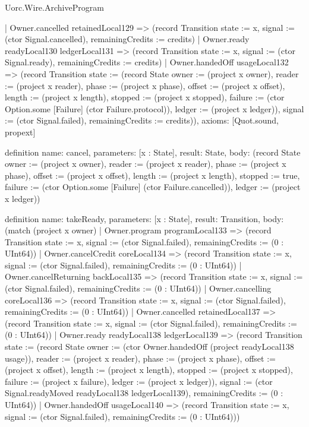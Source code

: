 \begin{lexlean}{Uorc.Wire.ArchiveProgram}
\begin{semanticmodule}
{    | Owner.cancelled retainedLocal129 => (record Transition {state := x, signal := (ctor Signal.cancelled), remainingCredits := credits})
    | Owner.ready readyLocal130 ledgerLocal131 => (record Transition {state := x, signal := (ctor Signal.ready), remainingCredits := credits})
    | Owner.handedOff usageLocal132 => (record Transition {state := (record State {owner := (project x owner), reader := (project x reader), phase := (project x phase), offset := (project x offset), length := (project x length), stopped := (project x stopped), failure := (ctor Option.some [Failure] (ctor Failure.protocol)), ledger := (project x ledger)}), signal := (ctor Signal.failed), remainingCredits := credits})),
  axioms: [Quot.sound, propext]
}

definition{
  name: cancel,
  parameters: [x : State],
  result: State,
  body: (record State {owner := (project x owner), reader := (project x reader), phase := (project x phase), offset := (project x offset), length := (project x length), stopped := true, failure := (ctor Option.some [Failure] (ctor Failure.cancelled)), ledger := (project x ledger)})
}

definition{
  name: takeReady,
  parameters: [x : State],
  result: Transition,
  body: (match (project x owner)
    | Owner.program programLocal133 => (record Transition {state := x, signal := (ctor Signal.failed), remainingCredits := (0 : UInt64)})
    | Owner.cancelCredit coreLocal134 => (record Transition {state := x, signal := (ctor Signal.failed), remainingCredits := (0 : UInt64)})
    | Owner.cancelReturning backLocal135 => (record Transition {state := x, signal := (ctor Signal.failed), remainingCredits := (0 : UInt64)})
    | Owner.cancelling coreLocal136 => (record Transition {state := x, signal := (ctor Signal.failed), remainingCredits := (0 : UInt64)})
    | Owner.cancelled retainedLocal137 => (record Transition {state := x, signal := (ctor Signal.failed), remainingCredits := (0 : UInt64)})
    | Owner.ready readyLocal138 ledgerLocal139 => (record Transition {state := (record State {owner := (ctor Owner.handedOff (project readyLocal138 usage)), reader := (project x reader), phase := (project x phase), offset := (project x offset), length := (project x length), stopped := (project x stopped), failure := (project x failure), ledger := (project x ledger)}), signal := (ctor Signal.readyMoved readyLocal138 ledgerLocal139), remainingCredits := (0 : UInt64)})
    | Owner.handedOff usageLocal140 => (record Transition {state := x, signal := (ctor Signal.failed), remainingCredits := (0 : UInt64)}))
}


\end{semanticmodule}
\end{lexlean}
